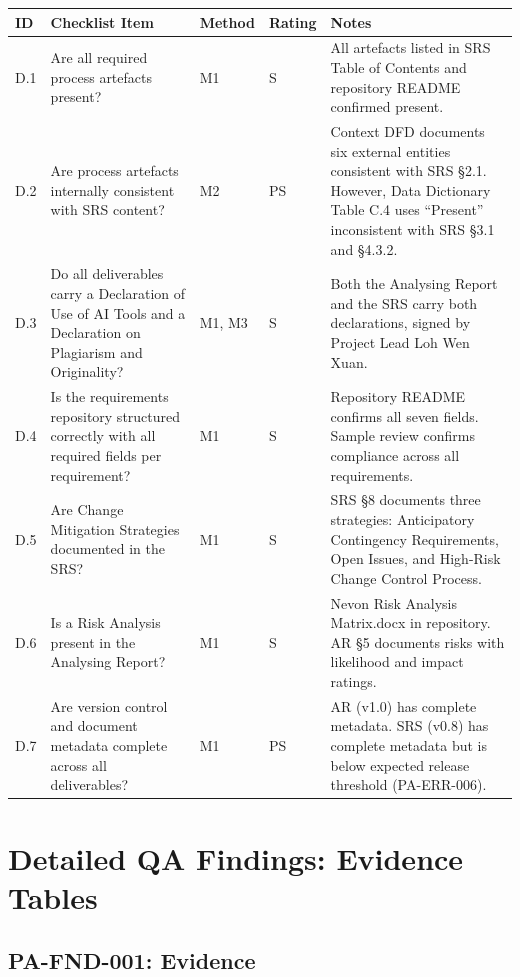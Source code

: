 \documentclass[11pt,a4paper]{article}
\begin{document}
\begin{longtable}{|L{0.8cm}|L{4cm}|L{1.3cm}|L{1.3cm}|L{5.5cm}|}
\hline
{}
\textbf{ID} & \textbf{Checklist Item} & \textbf{Method} & \textbf{Rating} & \textbf{Notes} \\
\hline
\endhead
D.1 & Are all required process artefacts present? & M1 & S & All artefacts listed in SRS Table of Contents and repository README confirmed present. \\\hline
D.2 & Are process artefacts internally consistent with SRS content? & M2 & PS & Context DFD documents six external entities consistent with SRS \S2.1. However, Data Dictionary Table C.4 uses ``Present'' inconsistent with SRS \S3.1 and \S4.3.2. \\\hline
D.3 & Do all deliverables carry a Declaration of Use of AI Tools and a Declaration on Plagiarism and Originality? & M1, M3 & S & Both the Analysing Report and the SRS carry both declarations, signed by Project Lead Loh Wen Xuan. \\\hline
D.4 & Is the requirements repository structured correctly with all required fields per requirement? & M1 & S & Repository README confirms all seven fields. Sample review confirms compliance across all requirements. \\\hline
D.5 & Are Change Mitigation Strategies documented in the SRS? & M1 & S & SRS \S8 documents three strategies: Anticipatory Contingency Requirements, Open Issues, and High-Risk Change Control Process. \\\hline
D.6 & Is a Risk Analysis present in the Analysing Report? & M1 & S & Nevon Risk Analysis Matrix.docx in repository. AR \S5 documents risks with likelihood and impact ratings. \\\hline
D.7 & Are version control and document metadata complete across all deliverables? & M1 & PS & AR (v1.0) has complete metadata. SRS (v0.8) has complete metadata but is below expected release threshold (PA-ERR-006). \\\hline
\end{longtable}

\clearpage
\renewcommand{\appendixprefix}{B}
\setcounter{page}{1}
\section{Detailed QA Findings: Evidence Tables}
\label{app:findings}

\subsection{PA-FND-001: Evidence}
\end{document}
